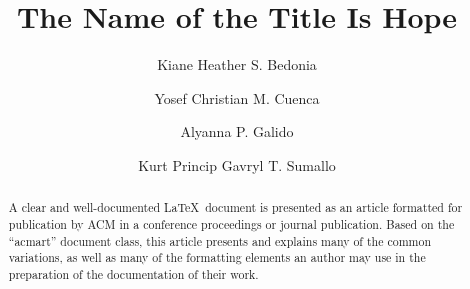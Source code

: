\documentclass[sigconf,natbib=true]{acmart}
\begin{document}
\title{The Name of the Title Is Hope}


\author{Kiane Heather S. Bedonia}

\author{Yosef Christian M. Cuenca}

\author{Alyanna P. Galido}

\author{Kurt Princip Gavryl T. Sumallo}

\renewcommand{\shortauthors}{Bedonia et al.}

\begin{abstract}
  A clear and well-documented \LaTeX\ document is presented as an
  article formatted for publication by ACM in a conference proceedings
  or journal publication. Based on the ``acmart'' document class, this
  article presents and explains many of the common variations, as well
  as many of the formatting elements an author may use in the
  preparation of the documentation of their work.
\end{abstract}
\end{document}

